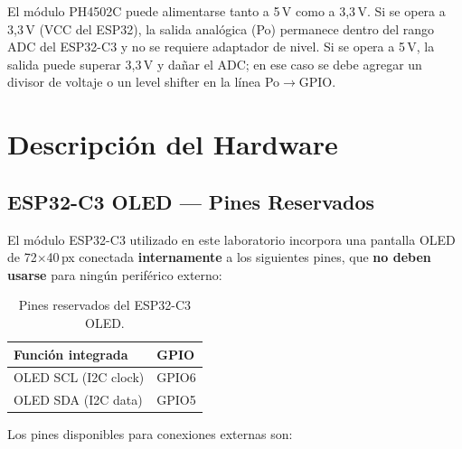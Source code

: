 \documentclass[12pt,leqno]{article}
\begin{document}
\begin{notabox}
El m\'odulo PH4502C puede alimentarse tanto a 5\,V como a 3,3\,V. Si se opera a
3,3\,V (VCC del ESP32), la salida anal\'ogica (Po) permanece dentro del rango ADC
del ESP32-C3 y no se requiere adaptador de nivel. Si se opera a 5\,V, la salida
puede superar 3,3\,V y da\~nar el ADC; en ese caso se debe agregar un divisor de
voltaje o un level shifter en la l\'inea Po$\to$GPIO.
\end{notabox}

\newpage
\section{Descripci\'on del Hardware}

\subsection{ESP32-C3 OLED --- Pines Reservados}

El m\'odulo ESP32-C3 utilizado en este laboratorio incorpora una pantalla OLED de
72$\times$40\,px conectada \textbf{internamente} a los siguientes pines, que
\textbf{no deben usarse} para ning\'un perif\'erico externo:

\begin{table}[h]
\centering
\begin{tabular}{|p{6cm}|p{3cm}|}
\hline
\textbf{Funci\'on integrada} & \textbf{GPIO} \\
\hline
OLED SCL (I2C clock) & GPIO6 \\
\hline
OLED SDA (I2C data) & GPIO5 \\
\hline
\end{tabular}
\caption{Pines reservados del ESP32-C3 OLED.}
\end{table}

Los pines disponibles para conexiones externas son:
\end{document}
